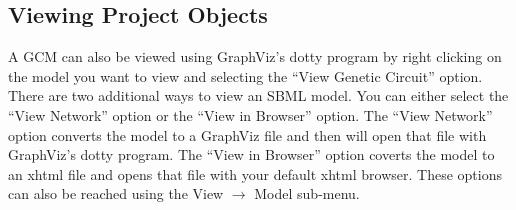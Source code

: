 \documentclass[titlepage,11pt]{article}
\begin{document}
\subsection{Viewing Project Objects}

\noindent
A GCM can also be viewed using 
GraphViz's
dotty program  by right clicking on the model you want to view and              
selecting the ``View Genetic Circuit'' option. 
There are two additional ways to view an SBML model. You
can either select the ``View Network'' option or the
``View in Browser'' option.  The ``View Network''
option converts the model to a GraphViz file and then will open that 
file with GraphViz's dotty program.  The ``View in Browser'' option 
coverts the model to an xhtml file and opens that file with your 
default xhtml browser.  These options can also be reached using the
View $\rightarrow$ Model sub-menu.
\end{document}
